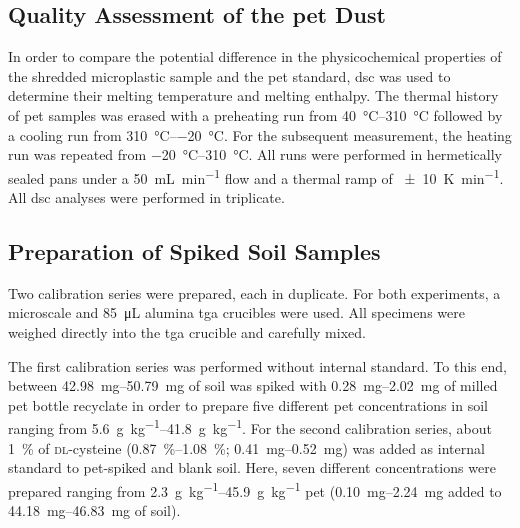 \subsection{Quality Assessment of the \Acs{pet} Dust}

In order to compare the potential difference in the physicochemical properties of the shredded microplastic sample and the \ac{pet} standard, \ac{dsc} was used to determine their melting temperature and melting enthalpy.
The thermal history of \ac{pet} samples was erased with a preheating run from \SIrange[range-phrase = { to }]{40}{310}{\degreeCelsius} followed by a cooling run from \SIrange[range-phrase = { to }]{310}{-20}{\degreeCelsius}.
For the subsequent measurement, the heating run was repeated from \SIrange[range-phrase = { to }]{-20}{310}{\degreeCelsius}. All runs were performed in hermetically sealed pans under a \SI{50}{\milli\liter\per\minute}  flow and a thermal ramp of \SI{+-10}{\kelvin\per\minute}. All \ac{dsc} analyses were performed in triplicate.

\subsection{Preparation of Spiked Soil Samples}

Two calibration series were prepared, each in duplicate. For both experiments, a microscale and \SI{85}{\micro\liter} alumina \ac{tga} crucibles were used. All specimens were weighed directly into the \ac{tga} crucible and carefully mixed.

The first calibration series was performed without internal standard. To this end, between \SIrange[range-phrase = { and }]{42.98}{50.79}{\milli\gram} of soil was spiked with \SIrange{0.28}{2.02}{\milli\gram} of milled \ac{pet} bottle recyclate in order to prepare five different \ac{pet} concentrations in soil ranging from \SIrange{5.6}{41.8}{\gram\per\kilo\gram}.
For the second calibration series, about \SI{1}{\percent} of \textsc{dl}-cysteine (\SIrange{0.87}{1.08}{\percent}; \SIrange{0.41}{0.52}{\milli\gram}) was added as internal standard to \ac{pet}-spiked and blank soil.
Here, seven different concentrations were prepared ranging from \SIrange[range-phrase = { to }]{2.3}{45.9}{\gram\per\kilo\gram} \ac{pet} (\SIrange{0.10}{2.24}{\milli\gram} added to \SIrange{44.18}{46.83}{\milli\gram} of soil).

